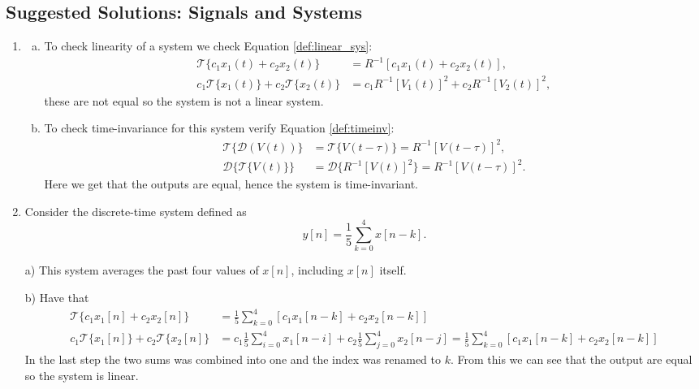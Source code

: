 \newpage
\subsection{Suggested Solutions: Signals and Systems}
\begin{enumerate}
\item

\begin{enumerate}[a)]
\item To check linearity of a system we check Equation \ref{def:linear_sys}:
\begin{align*}
    \mathcal{T}\{c_{1}x_{1}(t)+c_{2}x_{2}(t)\}&=R^{-1}[c_{1}x_{1}(t)+c_{2}x_{2}(t)], \\
    c_{1}\mathcal{T}\{x_{1}(t)\}+c_{2}\mathcal{T}\{x_{2}(t)\} &=c_{1}R^{-1}[V_{1}(t)]^{2} + c_{2}R^{-1}[V_{2}(t)]^{2},
\end{align*}
these are not equal so the system is not a linear system. 

\item To check time-invariance for this system verify Equation \ref{def:timeinv}:
\begin{align*}
    \mathcal{T}\{\mathcal{D}(V(t))\}&=\mathcal{T}\{V(t-\tau)\}=R^{-1}[V(t-\tau)]^{2}, \\
    \mathcal{D}\{\mathcal{T}\{V(t)\}\}&=\mathcal{D}\{R^{-1}[V(t)]^{2}\}=R^{-1}[V(t-\tau)]^{2}.
\end{align*}
Here we get that the outputs are equal, hence the system is time-invariant. 
\end{enumerate}

\item
Consider the discrete-time system defined as
$$y[n]=\frac{1}{5}\sum_{k=0}^{4}x[n-k].$$

\item[a)]
This system averages the past four values of $x[n]$, including $x[n]$ itself. 

\item[b)] Have that
\begin{align*}
    \mathcal{T}\{c_{1}x_{1}[n]+c_{2}x_{2}[n]\} &= \frac{1}{5}\sum_{k=0}^{4}[c_{1}x_{1}[n-k]+c_{2}x_{2}[n-k]] \\
    c_{1}\mathcal{T}\{x_{1}[n]\}+c_{2}\mathcal{T}\{x_{2}[n]\}&=c_{1}\frac{1}{5}\sum_{i=0}^{4}x_{1}[n-i]+c_{2}\frac{1}{5}\sum_{j=0}^{4}x_{2}[n-j]=\frac{1}{5}\sum_{k=0}^{4}[c_{1}x_{1}[n-k]+c_{2}x_{2}[n-k]]
\end{align*}
In the last step the two sums was combined into one and the index was renamed to $k$. From this we can see that the output are equal so the system is linear. 


\end{enumerate}
